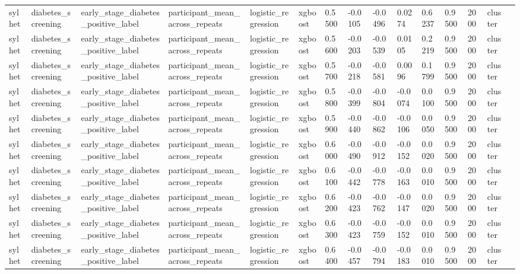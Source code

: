 \begin{tabular}{lllllllllllllll}
sylhet & diabetes\_screening & early\_stage\_diabetes\_positive\_label & participant\_mean\_across\_repeats & logistic\_regression & xgboost & 0.5500 & -0.0105 & -0.0496 & 0.0274 & 0.6237 & 0.9500 & 2000 & cluster &  \\
sylhet & diabetes\_screening & early\_stage\_diabetes\_positive\_label & participant\_mean\_across\_repeats & logistic\_regression & xgboost & 0.5600 & -0.0203 & -0.0539 & 0.0105 & 0.2219 & 0.9500 & 2000 & cluster &  \\
sylhet & diabetes\_screening & early\_stage\_diabetes\_positive\_label & participant\_mean\_across\_repeats & logistic\_regression & xgboost & 0.5700 & -0.0218 & -0.0581 & 0.0096 & 0.1799 & 0.9500 & 2000 & cluster &  \\
sylhet & diabetes\_screening & early\_stage\_diabetes\_positive\_label & participant\_mean\_across\_repeats & logistic\_regression & xgboost & 0.5800 & -0.0399 & -0.0804 & -0.0074 & 0.0100 & 0.9500 & 2000 & cluster &  \\
sylhet & diabetes\_screening & early\_stage\_diabetes\_positive\_label & participant\_mean\_across\_repeats & logistic\_regression & xgboost & 0.5900 & -0.0440 & -0.0862 & -0.0106 & 0.0050 & 0.9500 & 2000 & cluster &  \\
sylhet & diabetes\_screening & early\_stage\_diabetes\_positive\_label & participant\_mean\_across\_repeats & logistic\_regression & xgboost & 0.6000 & -0.0490 & -0.0912 & -0.0152 & 0.0020 & 0.9500 & 2000 & cluster &  \\
sylhet & diabetes\_screening & early\_stage\_diabetes\_positive\_label & participant\_mean\_across\_repeats & logistic\_regression & xgboost & 0.6100 & -0.0442 & -0.0778 & -0.0163 & 0.0010 & 0.9500 & 2000 & cluster &  \\
sylhet & diabetes\_screening & early\_stage\_diabetes\_positive\_label & participant\_mean\_across\_repeats & logistic\_regression & xgboost & 0.6200 & -0.0423 & -0.0762 & -0.0147 & 0.0020 & 0.9500 & 2000 & cluster &  \\
sylhet & diabetes\_screening & early\_stage\_diabetes\_positive\_label & participant\_mean\_across\_repeats & logistic\_regression & xgboost & 0.6300 & -0.0423 & -0.0759 & -0.0152 & 0.0010 & 0.9500 & 2000 & cluster &  \\
sylhet & diabetes\_screening & early\_stage\_diabetes\_positive\_label & participant\_mean\_across\_repeats & logistic\_regression & xgboost & 0.6400 & -0.0457 & -0.0794 & -0.0183 & 0.0010 & 0.9500 & 2000 & cluster &  \\

\end{tabular}
